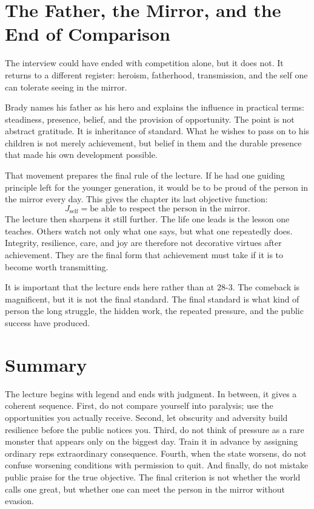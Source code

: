 \section{The Father, the Mirror, and the End of Comparison}

The interview could have ended with competition alone, but it does not. It returns to a different register: heroism, fatherhood, transmission, and the self one can tolerate seeing in the mirror.

Brady names his father as his hero and explains the influence in practical terms: steadiness, presence, belief, and the provision of opportunity. The point is not abstract gratitude. It is inheritance of standard. What he wishes to pass on to his children is not merely achievement, but belief in them and the durable presence that made his own development possible.

That movement prepares the final rule of the lecture. If he had one guiding principle left for the younger generation, it would be to be proud of the person in the mirror every day. This gives the chapter its last objective function:
\begin{equation}
J_{\text{self}}
=
\text{be able to respect the person in the mirror}.
\end{equation}
The lecture then sharpens it still further. The life one leads is the lesson one teaches. Others watch not only what one says, but what one repeatedly does. Integrity, resilience, care, and joy are therefore not decorative virtues after achievement. They are the final form that achievement must take if it is to become worth transmitting.

It is important that the lecture ends here rather than at \(28\text{-}3\). The comeback is magnificent, but it is not the final standard. The final standard is what kind of person the long struggle, the hidden work, the repeated pressure, and the public success have produced.

\section{Summary}

The lecture begins with legend and ends with judgment. In between, it gives a coherent sequence. First, do not compare yourself into paralysis; use the opportunities you actually receive. Second, let obscurity and adversity build resilience before the public notices you. Third, do not think of pressure as a rare monster that appears only on the biggest day. Train it in advance by assigning ordinary reps extraordinary consequence. Fourth, when the state worsens, do not confuse worsening conditions with permission to quit. And finally, do not mistake public praise for the true objective. The final criterion is not whether the world calls one great, but whether one can meet the person in the mirror without evasion.